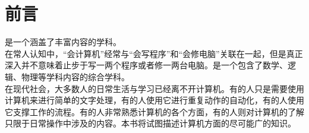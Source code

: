\chapter*{前言}\label{ch:preface}
    \cst 是一个涵盖了丰富内容的学科。\\
    在常人认知中，“会计算机”经常与“会写程序”和“会修电脑”关联在一起，但是真正深入\cst 并不意味着止步于写一两个程序或者修一两台电脑。\cst 是一个包含了数学、逻辑、物理等学科内容的综合学科。\\
    在现代社会，大多数人的日常生活与学习已经离不开计算机。有的人只是需要使用计算机来进行简单的文字处理，有的人使用它进行重复动作的自动化，有的人使用它支撑工作的流程。有的人非常熟悉计算机的各个方面，有的人则对计算机的了解只限于日常操作中涉及的内容。本书将试图描述计算机方面的尽可能广的知识。\\
